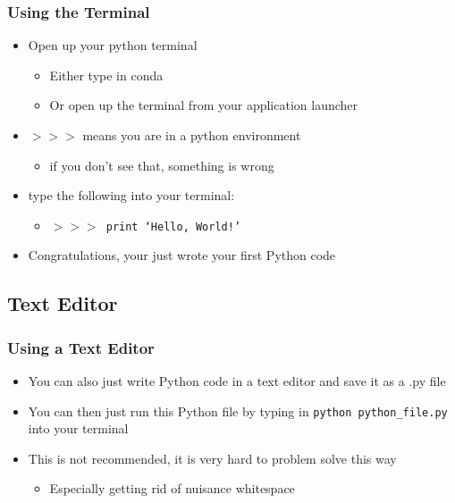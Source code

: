\documentclass[mini frame in current subsection]{beamer}
\begin{document}
		\begin{frame}
			\frametitle{Using the Terminal}
			\begin{itemize}
				\vfill \item  Open up your python terminal
					\begin{itemize}
						\item  Either type in conda
						\item  Or open up the terminal from your application launcher
					\end{itemize}
				\vfill \item  \texttt{$>>>$} means you are in a python environment
					\begin{itemize}
						\item  if you don't see that, something is wrong
					\end{itemize}
				\vfill \item  type the following into your terminal:
					\begin{itemize}
						\item  \texttt{$>>>$ print `Hello, World!'}
					\end{itemize}
				\vfill \item  Congratulations, your just wrote your first Python code
			\end{itemize}
		\end{frame}
		
	\subsection{Text Editor}
	
		\begin{frame}
			\frametitle{Using a Text Editor}
			\begin{itemize}
				\vfill \item  You can also just write Python code in a text editor and save it as a .py file
				\vfill \item  You can then just run this Python file by typing in \texttt{python python\_file.py} into your terminal
				\vfill \item  This is not recommended, it is very hard to problem solve this way
					\begin{itemize}
						\item  Especially getting rid of nuisance whitespace
					\end{itemize}
			\end{itemize}
		\end{frame}
		
\end{document}
